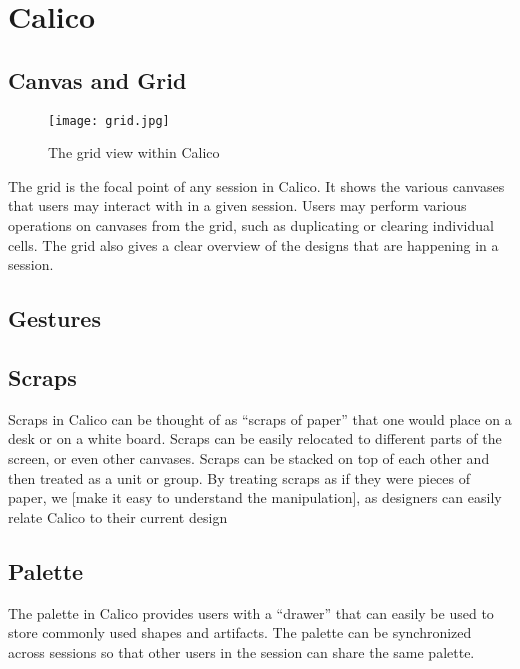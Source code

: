 \chapter{Calico}


\section{Canvas and Grid}

\begin{figure}[htb]
\centering
\texttt{[image: grid.jpg]}
\caption{The grid view within Calico}
\label{fig:grid}
\end{figure}
The grid is the focal point of any session in Calico.
It shows the various canvases that users may interact with in a given session.
Users may perform various operations on canvases from the grid, such as duplicating or clearing individual cells.
The grid also gives a clear overview of the designs that are happening in a session.

\section{Gestures}

\section{Scraps}
Scraps in Calico can be thought of as ``scraps of paper'' that one would place on a desk or on a white board.
Scraps can be easily relocated to different parts of the screen, or even other canvases.
Scraps can be stacked on top of each other and then treated as a unit or group.
By treating scraps as if they were pieces of paper, we [make it easy to understand the manipulation], as designers can easily relate Calico to their current design 

\section{Palette}
The palette in Calico provides users with a ``drawer'' that can easily be used to store commonly used shapes and artifacts.
The palette can be synchronized across sessions so that other users in the session can share the same palette.